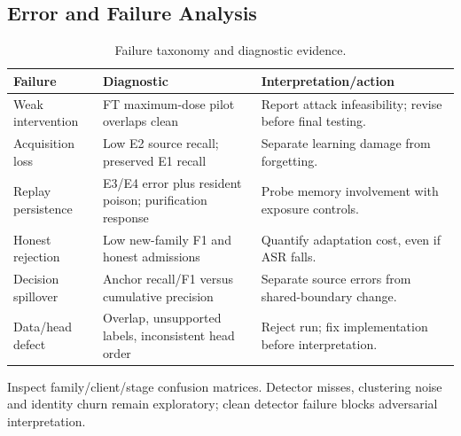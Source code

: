 \documentclass[10pt,a4paper]{article}
\begin{document}
\subsection{Error and Failure Analysis}
\begin{table}[htbp]
\centering\footnotesize
\caption{Failure taxonomy and diagnostic evidence.}
\label{tab:failure}
\begin{tabularx}{\linewidth}{L{2.3cm}Y Y}
\toprule
Failure & Diagnostic & Interpretation/action\\
\midrule
Weak intervention & FT maximum-dose pilot overlaps clean & Report attack infeasibility; revise before final testing.\\
Acquisition loss & Low E2 source recall; preserved E1 recall & Separate learning damage from forgetting.\\
Replay persistence & E3/E4 error plus resident poison; purification response & Probe memory involvement with exposure controls.\\
Honest rejection & Low new-family F1 and honest admissions & Quantify adaptation cost, even if ASR falls.\\
Decision spillover & Anchor recall/F1 versus cumulative precision & Separate source errors from shared-boundary change.\\
Data/head defect & Overlap, unsupported labels, inconsistent head order & Reject run; fix implementation before interpretation.\\
\bottomrule
\end{tabularx}
\end{table}
Inspect family/client/stage confusion matrices. Detector misses, clustering noise and identity churn remain exploratory; clean detector failure blocks adversarial interpretation.
\end{document}
